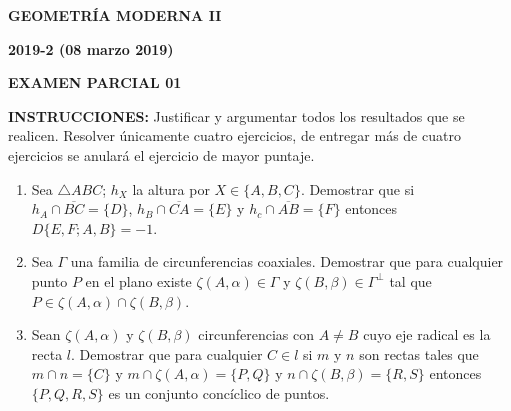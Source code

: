 \documentclass[12pt]{report}
\newcommand{\R}{\mathbb R}
\begin{document}
\begin{center}
\textbf{\LARGE {GEOMETRÍA MODERNA II}}
\end{center}

\begin{center}
\textbf{{\large 2019-2 (08 marzo 2019)}}
\end{center}

\begin{center}
\textbf{{\large EXAMEN PARCIAL 01}}
\end{center}

{\bf INSTRUCCIONES:} Justificar y argumentar todos los resultados que se realicen. Resolver únicamente cuatro ejercicios, de entregar más de cuatro ejercicios se anulará el ejercicio de mayor puntaje.

\begin{enumerate}


\item Sea $\triangle ABC$; $h_X$ la altura por $X \in \{A,B,C\}$. Demostrar que si $h_A \cap \overline{BC}=\{D\}$, $h_B \cap \overline{CA}=\{E\}$ y $h_c \cap \overline{AB}=\{F\}$ entonces $D\{E,F;A,B\} = -1$.


\item Sea $\Gamma$ una familia de circunferencias coaxiales. Demostrar que para cualquier punto $P$ en el plano existe $\zeta(A, \alpha) \in \Gamma$ y $\zeta(B,\beta) \in \Gamma^\bot$ tal que $P \in \zeta(A, \alpha) \cap \zeta(B,\beta)$.
 

\item Sean $\zeta(A,\alpha)$ y $\zeta(B,\beta)$ circunferencias con $A \neq B$ cuyo eje radical es la recta $l$. Demostrar que para cualquier $C \in l$ si $m$ y $n$ son rectas tales que $m \cap n = \{C\}$ y $m \cap \zeta(A, \alpha) = \{P,Q\}$ y $n \cap \zeta(B, \beta) = \{R,S\}$ entonces $\{P,Q,R,S\}$ es un conjunto concíclico de puntos.


\end{enumerate}
\end{document}
